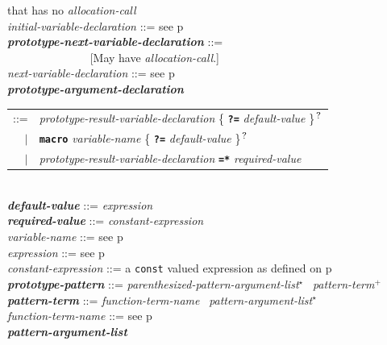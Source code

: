 \documentclass[12pt]{article}
\newcommand{\TT}[1]{{\tt \bfseries #1}}
\newcommand{\STAR}{{\Large $^\star$}}
\newcommand{\PLUS}[1][]{{$^{+#1}$}}
\newcommand{\QMARK}{{$^{\,\mbox{\footnotesize ?}}$}}
\newcommand{\emkey}[1]{{\em \bfseries #1}}
\newcommand{\pagref}[1]{p\pageref{#1}}
\newenvironment{indpar}[1][0.3in]%
	{\begin{list}{}%
		     {\setlength{\itemsep}{0in}%
		      \setlength{\topsep}{0in}%
		      \setlength{\parsep}{1ex}%
		      \setlength{\labelwidth}{#1}%
		      \setlength{\leftmargin}{#1}%
		      \addtolength{\leftmargin}{\labelsep}}%
	 \item}%
	{\end{list}}
\begin{document}
\begin{indpar}[0.1in]
\hspace*{0.5in}{\em initial-variable-declaration}
      that has no {\em allocation-call}
\\[0.5ex]
{\em initial-variable-declaration} ::= see \pagref{INITIAL-VARIABLE-DECLARATION}
\\[0.5ex]
\emkey{prototype-next-variable-declaration}%
    \label{PROTOTYPE-NEXT-VARIABLE-DECLARATION} ::= \\
\hspace*{0.5in}{\em next-variable-declaration} ~~~~~~~~~~~~~~
      [May have {\em allocation-call}.]
\\[0.5ex]
{\em next-variable-declaration} ::= see \pagref{NEXT-VARIABLE-DECLARATION}
\\[0.5ex]
\emkey{prototype-argument-declaration}\label{PROTOTYPE-ARGUMENT-DECLARATION} \\
\hspace*{0.5in}\begin{tabular}[t]{@{}rl@{}}
    ::= & {\em prototype-result-variable-declaration}
          \{ \TT{?=} {\em default-value} \}\QMARK{} \\
    $|$ & \TT{macro} {\em variable-name}
          \{ \TT{?=} {\em default-value} \}\QMARK{} \\
    $|$ & {\em prototype-result-variable-declaration}
          \TT{*=*} {\em required-value} \\
    \end{tabular}
\\[0.5ex]
\emkey{default-value} ::= {\em expression}
\\[0.5ex]
\emkey{required-value} ::= {\em constant-expression}
\\[0.5ex]
{\em variable-name} ::= see \pagref{VARIABLE-NAME}
\\[0.5ex]
{\em expression} ::= see \pagref{EXPRESSION}
\\[0.5ex]
{\em constant-expression} ::= a {\tt const} valued expression as
    defined on \pagref{CONSTANT-EXPRESSION}
\\[0.5ex]
\emkey{prototype-pattern}\label{PROTOTYPE-PATTERN}
    ::= {\em parenthesized-pattern-argument-list}\STAR{}~
        {\em pattern-term}\PLUS{}
\\[0.5ex]
\emkey{pattern-term}\label{PATTERN-TERM}
    ::= {\em function-term-name}~ {\em pattern-argument-list}\STAR{}
\\[0.5ex]
{\em function-term-name} ::= see \pagref{FUNCTION-TERM-NAME}
\\[0.5ex]
\emkey{pattern-argument-list}\label{PATTERN-ARGUMENT-LIST} \\

\end{indpar}
\end{document}
